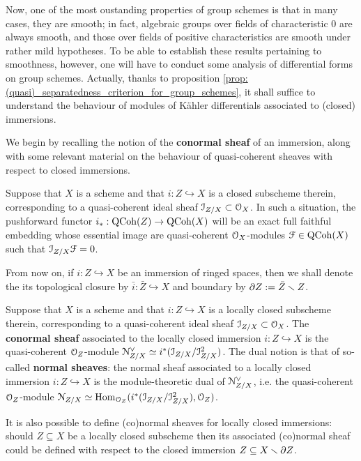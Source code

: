         Now, one of the most oustanding properties of group schemes is that in many cases, they are smooth; in fact, algebraic groups over fields of characteristic $0$ are always smooth, and those over fields of positive characteristics are smooth under rather mild hypotheses. To be able to establish these results pertaining to smoothness, however, one will have to conduct some analysis of differential forms on group schemes. Actually, thanks to proposition \ref{prop: (quasi)_separatedness_criterion_for_group_schemes}, it shall suffice to understand the behaviour of modules of K\"ahler differentials associated to (closed) immersions.
            
        We begin by recalling the notion of the \textbf{conormal sheaf} of an immersion, along with some relevant material on the behaviour of quasi-coherent sheaves with respect to closed immersions. 
        \begin{lemma} \label{lemma: quasi_coherent_sheaves_on_closed_subschemes}
            \cite[\href{https://stacks.math.columbia.edu/tag/01QY}{Tag 01QY}]{stacks-project} Suppose that $X$ is a scheme and that $i: Z \hookrightarrow X$ is a closed subscheme therein, corresponding to a quasi-coherent ideal sheaf $\mathcal{I}_{Z/X} \subset \mathcal{O}_X$. In such a situation, the pushforward functor $i_*: \mathrm{QCoh}(Z)\to \mathrm{QCoh}(X)$ will be an exact full faithful embedding whose essential image are quasi-coherent $\mathcal{O}_X$-modules $\mathcal{F} \in \mathrm{QCoh}(X)$ such that $\mathcal{I}_{Z/X} \mathcal{F} = 0$.
        \end{lemma}
        \begin{convention} \label{conv: closures_and_boundaries}
            From now on, if $i: Z \hookrightarrow X$ be an immersion of ringed spaces, then we shall denote the its topological closure by $\bar{i}: \bar{Z} \hookrightarrow X$ and boundary by $\partial Z := \bar{Z} \smallsetminus Z$. 
        \end{convention}
        \begin{definition} \label{def: (co)normal_sheaves_of_closed_immersions}
            Suppose that $X$ is a scheme and that $i: Z \hookrightarrow X$ is a locally closed subscheme therein, corresponding to a quasi-coherent ideal sheaf $\mathcal{I}_{Z/X} \subset \mathcal{O}_X$. The \textbf{conormal sheaf} associated to the locally closed immersion $i: Z \hookrightarrow X$ is the quasi-coherent $\mathcal{O}_Z$-module $\mathcal{N}_{Z/X}^{\vee} \simeq i^*(\mathcal{I}_{Z/X}/\mathcal{I}_{Z/X}^2)$. The dual notion is that of so-called \textbf{normal sheaves}: the normal sheaf associated to a locally closed immersion $i: Z \hookrightarrow X$ is the module-theoretic dual of $\mathcal{N}_{Z/X}^{\vee}$, i.e. the quasi-coherent $\mathcal{O}_Z$-module $\mathcal{N}_{Z/X} \simeq \mathrm{Hom}_{\mathcal{O}_Z}(i^*(\mathcal{I}_{Z/X}/\mathcal{I}_{Z/X}^2), \mathcal{O}_Z)$. 
            
            It is also possible to define (co)normal sheaves for locally closed immersions: should $Z \subseteq X$ be a locally closed subscheme then its associated (co)normal sheaf could be defined with respect to the closed immersion $Z \subseteq X \smallsetminus \partial Z$.
        \end{definition} 
